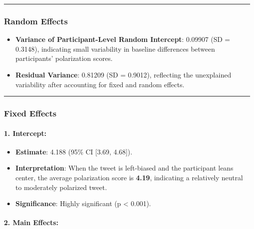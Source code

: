 \documentclass[
]{article}
\providecommand{\tightlist}{%
  \setlength{\itemsep}{0pt}\setlength{\parskip}{0pt}}
\begin{document}
\begin{center}\rule{0.5\linewidth}{0.5pt}\end{center}

\subsubsection{\texorpdfstring{\textbf{Random
Effects}}{Random Effects}}\label{random-effects-4}

\begin{itemize}
\tightlist
\item
  \textbf{Variance of Participant-Level Random Intercept}: 0.09907 (SD =
  0.3148), indicating small variability in baseline differences between
  participants' polarization scores.
\item
  \textbf{Residual Variance}: 0.81209 (SD = 0.9012), reflecting the
  unexplained variability after accounting for fixed and random effects.
\end{itemize}

\begin{center}\rule{0.5\linewidth}{0.5pt}\end{center}

\subsubsection{\texorpdfstring{\textbf{Fixed
Effects}}{Fixed Effects}}\label{fixed-effects-4}

\paragraph{\texorpdfstring{\textbf{1.
Intercept}:}{1. Intercept:}}\label{intercept-4}

\begin{itemize}
\tightlist
\item
  \textbf{Estimate}: 4.188 (95\% CI {[}3.69, 4.68{]}).
\item
  \textbf{Interpretation}: When the tweet is left-biased and the
  participant leans center, the average polarization score is
  \textbf{4.19}, indicating a relatively neutral to moderately polarized
  tweet.
\item
  \textbf{Significance}: Highly significant (p \textless{} 0.001).
\end{itemize}

\paragraph{\texorpdfstring{\textbf{2. Main
Effects}:}{2. Main Effects:}}\label{main-effects}
\end{document}
